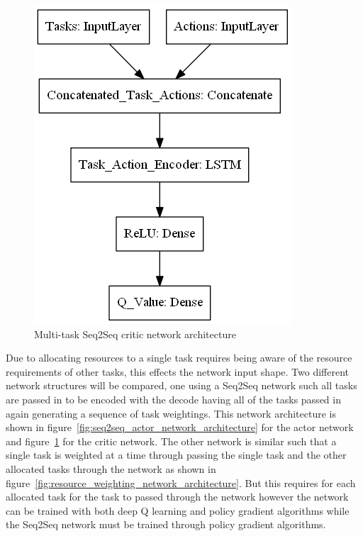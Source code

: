 \begin{figure}[H]
\begin{minipage}{0.55\linewidth}
        \includegraphics[width=\linewidth]{figures/3_solution_figs/single_task_critic_weighting_network_architecture.png}
        \caption{Multi-task Seq2Seq critic network architecture}
        \label{fig:seq2seq_critic_network_architecture}
    \end{minipage}
\end{figure}

Due to allocating resources to a single task requires being aware of the resource requirements of other tasks, this
effects the network input shape. Two different network structures will be compared, one using a Seq2Seq network such
all tasks are passed in to be encoded with the decode having all of the tasks passed in again generating a sequence of
task weightings. This network architecture is shown in figure~\ref{fig:seq2seq_actor_network_architecture} for the actor
network and figure~\ref{fig:seq2seq_critic_network_architecture} for the critic network. The other network is similar
such that a single task is weighted at a time through passing the single task and the other allocated tasks through the
network as shown in figure~\ref{fig:resource_weighting_network_architecture}. But this requires for each allocated task
for the task to passed through the network however the network can be trained with both deep Q learning and policy
gradient algorithms while the Seq2Seq network must be trained through policy gradient algorithms.

